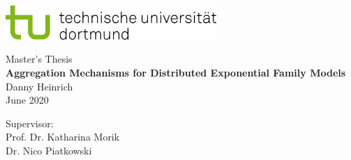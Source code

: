 \begin{titlepage}
\vspace*{-2cm}
\newlength{\links}
\setlength{\links}{-1.5cm}
\sffamily
\hspace*{\links}
\begin{minipage}{12.5cm}
\includegraphics[width=8cm]{bilder/tud_logo_rgb}
\end{minipage}

\vspace*{4cm}

\hspace*{\links}
\hspace*{-0.2cm}
\begin{minipage}{9cm}
\large
\begin{center}
{\Large Master's Thesis} \\
\vspace*{1cm}
\textbf{Aggregation Mechanisms for Distributed Exponential Family Models} \\
\vspace*{1cm}
Danny Heinrich\\
June 2020
\end{center}
\end{minipage}
\normalsize
\vspace*{5.5cm}


\vspace*{2.1cm}
\hspace*{\links}
\begin{minipage}[b]{5cm}
\raggedright
Supervisor: \\
Prof. Dr. Katharina Morik \\
Dr. Nico Piatkowski \\
\end{minipage}


\end{titlepage}
